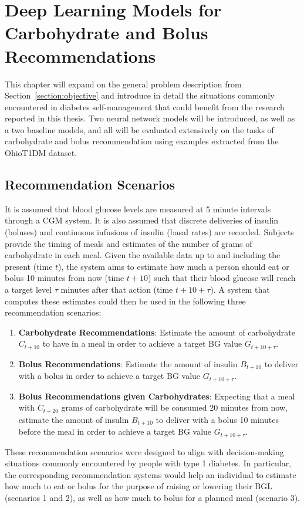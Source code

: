 \chapter{Deep Learning Models for Carbohydrate and Bolus Recommendations}
\label{chapter:models}

This chapter will expand on the general problem description from Section~\ref{section:objective} and introduce in detail the situations commonly encountered in diabetes self-management that could benefit from the research reported in this thesis. Two neural network models will be introduced, as well as a two baseline models, and all will be evaluated extensively on the tasks of carbohydrate and bolus recommendation using examples extracted from the OhioT1DM dataset.

\section{Recommendation Scenarios}
\label{sec:scenarios}

It is assumed that blood glucose levels are measured at 5 minute intervals through a \ac{CGM} system. It is also assumed that discrete deliveries of insulin (boluses) and continuous infusions of insulin (basal rates) are recorded. Subjects provide the timing of meals and estimates of the number of grams of carbohydrate in each meal. Given the available data up to and including the present (time $t$), the system aims to estimate how much a person should eat or bolus 10 minutes from now (time $t+10$) such that their blood glucose will reach a target level $\tau$ minutes after that action (time $t + 10 + \tau$). A system that computes these estimates could then be used in the following three recommendation scenarios:
\begin{enumerate}
    \item {\bf Carbohydrate Recommendations}: Estimate the amount of carbohydrate $C_{t+10}$ to have in a meal in order to achieve a target \ac{BG} value $G_{t+10+\tau}$.
    \item {\bf Bolus Recommendations}: Estimate the amount of insulin $B_{t+10}$ to deliver with a bolus in order to achieve a target \ac{BG} value $G_{t+10+\tau}$.
    \item {\bf Bolus Recommendations given Carbohydrates}: Expecting that a meal with $C_{t+20}$ grams of carbohydrate will be consumed 20 minutes from now, estimate the amount of insulin $B_{t+10}$ to deliver with a bolus 10 minutes before the meal in order to achieve a target \ac{BG} value $G_{t+10+\tau}$.
\end{enumerate}
These recommendation scenarios were designed to align with decision-making situations commonly encountered by people with type 1 diabetes. In particular, the corresponding recommendation systems would help an individual to estimate how much to eat or bolus for the purpose of raising or lowering their \ac{BGL} (scenarios 1 and 2), as well as how much to bolus for a planned meal (scenario 3). 

